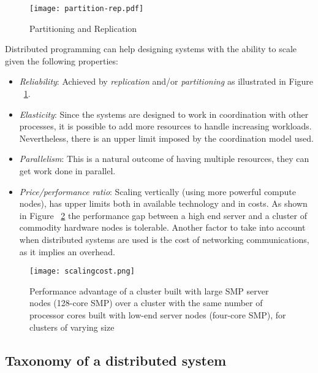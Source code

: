 \begin{figure}[!h]
\begin{center}
\texttt{[image: partition-rep.pdf]}
\caption{Partitioning and Replication}
\label{fig:partitioning}
\end{center}
\end{figure}

Distributed programming can help designing systems with the ability to scale given
the following properties:
%
\begin{itemize}
\item \textit{Reliability}: Achieved by \textit{replication} and/or
  \textit{partitioning} as illustrated in Figure ~\ref{fig:partitioning}.
\item \textit{Elasticity}: Since the systems are designed to work in
  coordination with other processes, it is possible to add more resources to
  handle increasing workloads. Nevertheless, there is an upper limit imposed by the
  coordination model used.
\item \textit{Parallelism}: This is a natural outcome of having multiple resources, they
  can get work done in parallel.
\item \textit{Price/performance ratio}: Scaling vertically (using more powerful
  compute nodes), has upper limits both in available technology and in costs. As
  shown in Figure ~\ref{fig:highend} the performance gap between a high end
  server and a cluster of commodity hardware nodes is tolerable. Another factor
  to take into account when distributed systems are used is the cost of
  networking communications, as it implies an overhead.
\end{itemize}

\begin{figure}[!h]
\begin{center}
\texttt{[image: scalingcost.png]}
\caption[Clustered commodity hardware compared with single-node high-end hardware performance]{Performance advantage of a cluster built with large SMP server nodes
  (128-core SMP) over a cluster with the same number of processor cores built
  with low-end server nodes (four-core SMP), for clusters of varying
  size~\cite{Datacenter}}
\label{fig:highend}
\end{center}
\end{figure}

\subsection{Taxonomy of a distributed system}

